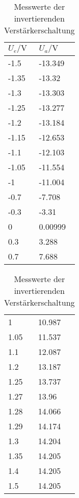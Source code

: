 \begin{table}[H]
  \begin{center}
\begin{tabular}{@{}ll@{}}
\toprule
$U_e / \si{\volt}$ & $U_a / \si{\volt}$ \\ \midrule
-1.5               & -13.349            \\
-1.35              & -13.32             \\
-1.3               & -13.303            \\
-1.25              & -13.277            \\
-1.2               & -13.184            \\
-1.15              & -12.653            \\
-1.1               & -12.103            \\
-1.05              & -11.554            \\
-1                 & -11.004            \\
-0.7               & -7.708             \\
-0.3               & -3.31              \\
0                  & 0.00999            \\ 
0.3                & 3.288              \\
0.7                & 7.688              \\
\end{tabular}
\hspace{0.1459\textwidth}
\begin{tabular}{@{}ll@{}}
1                  & 10.987             \\
1.05               & 11.537             \\
1.1                & 12.087             \\
1.2                & 13.187             \\
1.25               & 13.737             \\
1.27               & 13.96              \\
1.28               & 14.066             \\
1.29               & 14.174             \\
1.3                & 14.204             \\
1.35               & 14.205             \\
1.4                & 14.205             \\
1.5                & 14.205             \\ \bottomrule
  \end{tabular}
\end{center}
\caption{Messwerte der invertierenden Verstärkerschaltung}
\end{table}